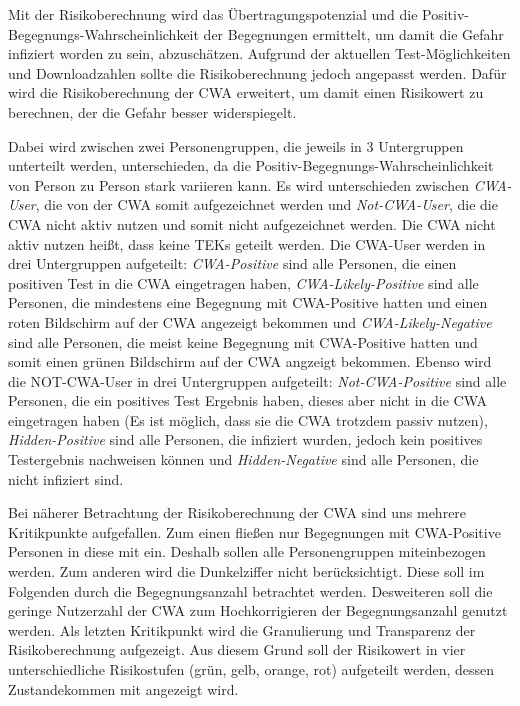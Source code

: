 \documentclass[conference]{IEEEtran}
\begin{document}
Mit der Risikoberechnung wird das Übertragungspotenzial und die Positiv-Begegnungs-Wahrscheinlichkeit der Begegnungen ermittelt,
um damit die Gefahr infiziert worden zu sein, abzuschätzen.
Aufgrund der aktuellen Test-Möglichkeiten und Downloadzahlen sollte die Risikoberechnung jedoch angepasst werden.
Dafür wird die Risikoberechnung der CWA erweitert, 
um damit einen Risikowert zu berechnen, der die Gefahr besser widerspiegelt.

Dabei wird zwischen zwei Personengruppen, die jeweils in 3 Untergruppen unterteilt werden, unterschieden, 
da die Positiv-Begegnungs-Wahrscheinlichkeit von Person zu Person stark variieren kann.
Es wird unterschieden zwischen \textit{CWA-User}, die von der CWA somit aufgezeichnet werden und \textit{Not-CWA-User}, 
die die CWA nicht aktiv nutzen und somit nicht aufgezeichnet werden. Die CWA nicht aktiv nutzen heißt, dass keine TEKs geteilt werden.
Die CWA-User werden in drei Untergruppen aufgeteilt: 
\textit{CWA-Positive} sind alle Personen, die einen positiven Test in die CWA eingetragen haben,
\textit{CWA-Likely-Positive} sind alle Personen, die mindestens eine Begegnung mit CWA-Positive hatten und einen roten Bildschirm auf der CWA angezeigt bekommen und
\textit{CWA-Likely-Negative} sind alle Personen, die meist keine Begegnung mit CWA-Positive hatten und somit einen grünen Bildschirm auf der CWA angzeigt bekommen.
Ebenso wird die NOT-CWA-User in drei Untergruppen aufgeteilt: \textit{Not-CWA-Positive} sind alle Personen, die ein positives Test Ergebnis haben, 
dieses aber nicht in die CWA eingetragen haben (Es ist möglich, dass sie die CWA trotzdem passiv nutzen), \textit{Hidden-Positive} sind alle Personen, die infiziert wurden, 
jedoch kein positives Testergebnis nachweisen können und \textit{Hidden-Negative} sind alle Personen, die nicht infiziert sind.

Bei näherer Betrachtung der Risikoberechnung der CWA sind uns mehrere Kritikpunkte aufgefallen.
Zum einen fließen nur Begegnungen mit CWA-Positive Personen in diese mit ein.
Deshalb sollen alle Personengruppen miteinbezogen werden.
Zum anderen wird die Dunkelziffer nicht berücksichtigt. Diese soll im Folgenden durch die Begegnungsanzahl betrachtet werden.
Desweiteren soll die geringe Nutzerzahl der CWA zum Hochkorrigieren der Begegnungsanzahl genutzt werden.
Als letzten Kritikpunkt wird die Granulierung und Transparenz der Risikoberechnung aufgezeigt. 
Aus diesem Grund soll der Risikowert in vier unterschiedliche Risikostufen (grün, gelb, orange, rot) aufgeteilt werden, dessen Zustandekommen mit angezeigt wird.
\end{document}
